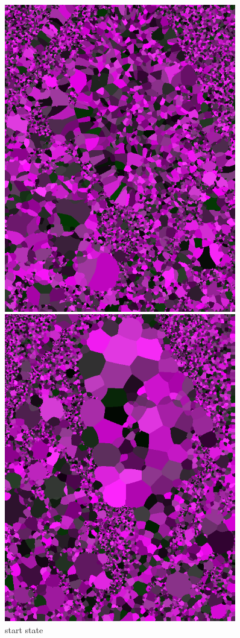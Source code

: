 \documentclass[11pt]{article}
\begin{document}
\begin{figure}[htbp]
\centering
\begin{minipage}[t]{0.48\textwidth}
\centering
\includegraphics[width = 0.9\textwidth]{gpu_start.png}
\caption{start state}
\end{minipage}
\begin{minipage}[t]{0.48\textwidth}
\centering
\includegraphics[width = 0.9\textwidth]{gpu_end.png}

\end{minipage}
\end{figure}
\end{document}
